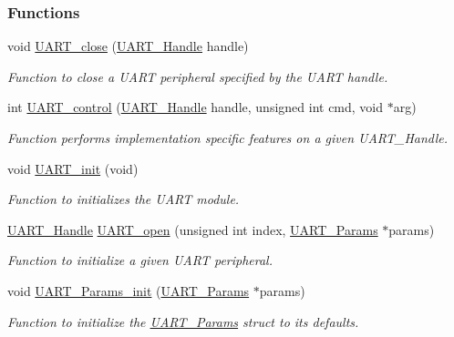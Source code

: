\subsubsection*{Functions}
\begin{DoxyCompactItemize}
\item 
void \hyperlink{_u_a_r_t_8h_a6b49b65f3db709c408dc4db23a68895d}{U\+A\+R\+T\+\_\+close} (\hyperlink{_u_a_r_t_8h_a13cc669fae768d8212e6491ce71b28af}{U\+A\+R\+T\+\_\+\+Handle} handle)
\begin{DoxyCompactList}\small\item\em Function to close a U\+A\+R\+T peripheral specified by the U\+A\+R\+T handle. \end{DoxyCompactList}\item 
int \hyperlink{_u_a_r_t_8h_a9de3c26cfe4ce6b7f350a6ea6e16801d}{U\+A\+R\+T\+\_\+control} (\hyperlink{_u_a_r_t_8h_a13cc669fae768d8212e6491ce71b28af}{U\+A\+R\+T\+\_\+\+Handle} handle, unsigned int cmd, void $\ast$arg)
\begin{DoxyCompactList}\small\item\em Function performs implementation specific features on a given U\+A\+R\+T\+\_\+\+Handle. \end{DoxyCompactList}\item 
void \hyperlink{_u_a_r_t_8h_ab60a36f7295d704926120d22f806dcd1}{U\+A\+R\+T\+\_\+init} (void)
\begin{DoxyCompactList}\small\item\em Function to initializes the U\+A\+R\+T module. \end{DoxyCompactList}\item 
\hyperlink{_u_a_r_t_8h_a13cc669fae768d8212e6491ce71b28af}{U\+A\+R\+T\+\_\+\+Handle} \hyperlink{_u_a_r_t_8h_a0442ea1ec23901168da31726bb3254c1}{U\+A\+R\+T\+\_\+open} (unsigned int index, \hyperlink{struct_u_a_r_t___params}{U\+A\+R\+T\+\_\+\+Params} $\ast$params)
\begin{DoxyCompactList}\small\item\em Function to initialize a given U\+A\+R\+T peripheral. \end{DoxyCompactList}\item 
void \hyperlink{_u_a_r_t_8h_a40e5c0823bb7ffd2e8fbf19f9f20b399}{U\+A\+R\+T\+\_\+\+Params\+\_\+init} (\hyperlink{struct_u_a_r_t___params}{U\+A\+R\+T\+\_\+\+Params} $\ast$params)
\begin{DoxyCompactList}\small\item\em Function to initialize the \hyperlink{struct_u_a_r_t___params}{U\+A\+R\+T\+\_\+\+Params} struct to its defaults. \end{DoxyCompactList}\item 

\end{DoxyCompactItemize}
